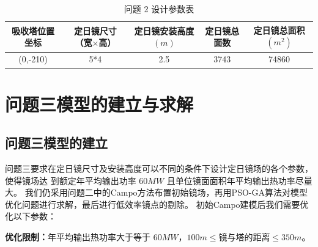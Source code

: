 \documentclass{article}
\numberwithin{equation}{subsection}
\begin{document}
\begin{table}[!htbp]
    \centering
    \begin{tabular}{|c|c|c|c|c|}\hline
        吸收塔位置坐标&\makecell[c]{定日镜尺寸\\（宽$\times$高）}&\makecell[c]{定日镜安装高度\\$(m)$}&定日镜总面数&\makecell[c]{定日镜总面积\\$(m^2)$}\\\hline
        (0,-210)&	5*4&	2.5&	3743&	74860
\\\hline
    \end{tabular}
    \caption{问题 2 设计参数表}
\end{table}
{\centering\section{问题三模型的建立与求解}}

\subsection{问题三模型的建立}
问题三要求在定日镜尺寸及安装高度可以不同的条件下设计定日镜场的各个参数，使得镜场达
到额定年平均输出功率 $60MW$ 且单位镜面面积年平均输出热功率尽量大。
我们仍采用问题二中的Campo方法布置初始镜场，再用PSO-GA算法对模型优化问题进行求解，最后进行低效率镜点的剔除。
初始Campo建模后我们需要优化以下参数：

\begin{table}[H]
    \centering
    \caption{问题3模型优化参数列表}
\end{table}

\textbf{优化限制：}年平均输出热功率大于等于 $ 60 MW$，$100m\leq$镜与塔的距离$\leq 350m$。
\end{document}
